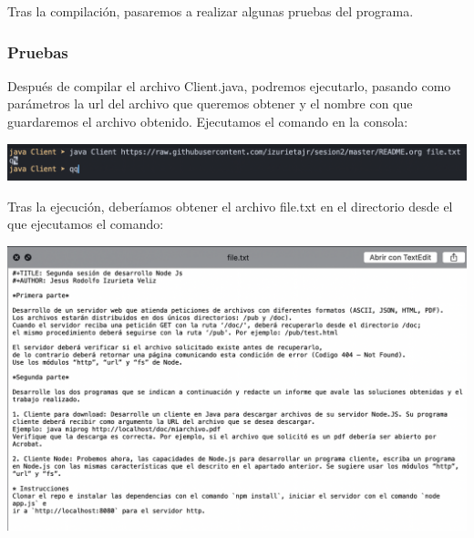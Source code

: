 \documentclass[11pt]{article}
\begin{document}
Tras la compilación, pasaremos a realizar algunas pruebas del programa.

\subsubsection{Pruebas}
\label{sec:org42d74b4}
Después de compilar el archivo Client.java, podremos ejecutarlo,
pasando como parámetros la url del archivo que queremos obtener y el nombre con que guardaremos el archivo obtenido.
Ejecutamos el comando en la consola:

\begin{center}
\includegraphics[width=.9\linewidth]{./comando.png}
\end{center}

Tras la ejecución, deberíamos obtener el archivo file.txt en el directorio desde el que ejecutamos el comando:

\begin{center}
\includegraphics[width=.9\linewidth]{./archivo.png}
\end{center}
\end{document}
